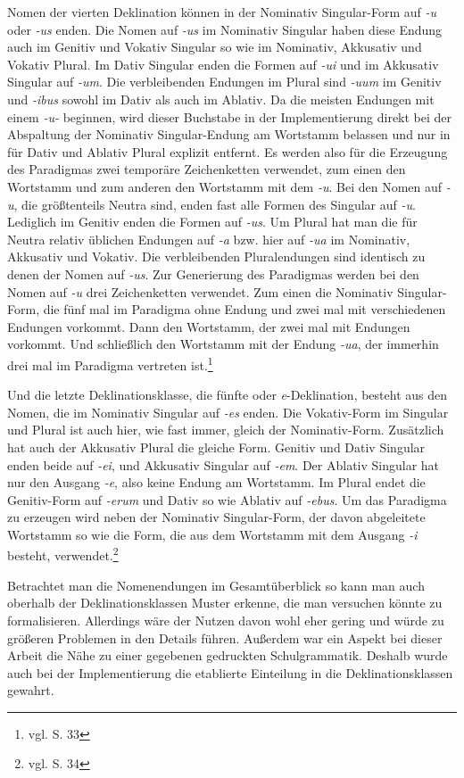 Nomen der vierten Deklination können in der Nominativ Singular-Form auf \textit{-u} oder \textit{-us} enden. Die Nomen auf \textit{-us} im Nominativ Singular haben diese Endung auch im Genitiv und Vokativ Singular so wie im Nominativ, Akkusativ und Vokativ Plural. Im Dativ Singular enden die Formen auf \textit{-ui} und im Akkusativ Singular auf \textit{-um}. Die verbleibenden Endungen im Plural sind \textit{-uum} im Genitiv und \textit{-ibus} sowohl im Dativ als auch im Ablativ. Da die meisten Endungen mit einem \textit{-u-} beginnen, wird dieser Buchstabe in der Implementierung direkt bei der Abspaltung der Nominativ Singular-Endung am Wortstamm belassen und nur in für Dativ und Ablativ Plural explizit entfernt. Es werden also für die Erzeugung des Paradigmas zwei temporäre Zeichenketten verwendet, zum einen den Wortstamm und zum anderen den Wortstamm mit dem \textit{-u}. Bei den Nomen auf \textit{-u}, die größtenteils Neutra sind, enden fast alle Formen des Singular auf \textit{-u}. Lediglich im Genitiv enden die Formen auf \textit{-us}. Um Plural hat man die für Neutra relativ üblichen Endungen auf \textit{-a} bzw. hier auf \textit{-ua} im Nominativ, Akkusativ und Vokativ. Die verbleibenden Pluralendungen sind identisch zu denen der Nomen auf \textit{-us}. Zur Generierung des Paradigmas werden bei den Nomen auf \textit{-u} drei Zeichenketten verwendet. Zum einen die Nominativ Singular-Form, die fünf mal im Paradigma ohne Endung und zwei mal mit verschiedenen Endungen vorkommt. Dann den Wortstamm, der zwei mal mit Endungen vorkommt. Und schließlich den Wortstamm mit der Endung \textit{-ua}, der immerhin drei mal im Paradigma vertreten ist.\footnote{vgl. \cite{BAYER-LINDAUER1994} S. 33} \par
Und die letzte Deklinationsklasse, die fünfte oder \textit{e}-Deklination, besteht aus den Nomen, die im Nominativ Singular auf \textit{-es} enden. Die Vokativ-Form im Singular und Plural ist auch hier, wie fast immer, gleich der Nominativ-Form. Zusätzlich hat auch der Akkusativ Plural die gleiche Form. Genitiv und Dativ Singular enden beide auf \textit{-ei}, und Akkusativ Singular auf \textit{-em}. Der Ablativ Singular hat nur den Ausgang \textit{-e}, also keine Endung am Wortstamm. Im Plural endet die Genitiv-Form auf \textit{-erum} und Dativ so wie Ablativ auf \textit{-ebus}. Um das Paradigma zu erzeugen wird neben der Nominativ Singular-Form, der davon abgeleitete Wortstamm so wie die Form, die aus dem Wortstamm mit dem Ausgang \textit{-i} besteht, verwendet.\footnote{vgl. \cite{BAYER-LINDAUER1994} S. 34} \par
Betrachtet man die Nomenendungen im Gesamtüberblick so kann man auch oberhalb der Deklinationsklassen Muster erkenne, die man versuchen könnte zu formalisieren. Allerdings wäre der Nutzen davon wohl eher gering und würde zu größeren Problemen in den Details führen. Außerdem war ein Aspekt bei dieser Arbeit die Nähe zu einer gegebenen gedruckten Schulgrammatik. Deshalb wurde auch bei der Implementierung die etablierte Einteilung in die Deklinationsklassen gewahrt.

